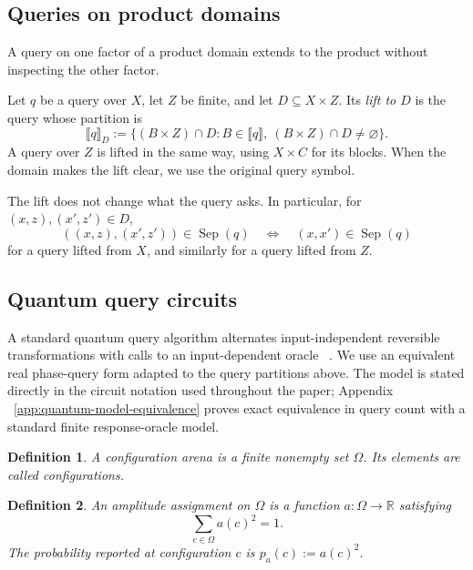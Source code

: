 \documentclass[11pt]{article}
\numberwithin{equation}{section}
\newtheorem{definition}{Definition}[section]
\theoremstyle{remark}
\begin{document}
\subsection{Queries on product domains}
\label{subsec:product-query-lifts}

A query on one factor of a product domain extends to the product without
inspecting the other factor.

Let $q$ be a query over $X$, let $Z$ be finite, and let
$D\subseteq X\times Z$.  Its \emph{lift to $D$} is the query whose partition
is
\begin{equation}
    \llbracket q\rrbracket_D
    :=
    \{(B\times Z)\cap D:
        B\in\llbracket q\rrbracket,\ (B\times Z)\cap D\neq\varnothing\}.
\end{equation}
A query over $Z$ is lifted in the same way, using $X\times C$ for its
blocks.  When the domain makes the lift clear, we use the original query
symbol.

The lift does not change what the query asks.  In particular, for
$(x,z),(x',z')\in D$,
\begin{equation}
    ((x,z),(x',z'))\in\operatorname{Sep}(q)
    \quad\Longleftrightarrow\quad
    (x,x')\in\operatorname{Sep}(q)
\end{equation}
for a query lifted from $X$, and similarly for a query lifted from $Z$.



\subsection{Quantum query circuits}
\label{sec:quantum-query-circuits}
\label{subsec:quantum-query-computation}

A standard quantum query algorithm alternates input-independent reversible
transformations with calls to an input-dependent oracle
~\cite{BealsBuhrmanCleveMoscaDeWolf2001}. We use an equivalent real
phase-query form adapted to the query partitions above. The model is stated
directly in the circuit notation used throughout the paper; Appendix
~\ref{app:quantum-model-equivalence} proves exact equivalence in query count
with a standard finite response-oracle model.

\begin{definition}
\label{def:configuration-arena}
A \emph{configuration arena} is a finite nonempty set $\Omega$. Its elements
are called \emph{configurations}.
\end{definition}

\begin{definition}
\label{def:configuration-amplitude}
An \emph{amplitude assignment} on $\Omega$ is a function
$a:\Omega\to\mathbb R$ satisfying
\begin{equation}
    \sum_{c\in\Omega}a(c)^2=1.
\end{equation}
The probability reported at configuration $c$ is
$p_a(c):=a(c)^2$.
\end{definition}
\end{document}

